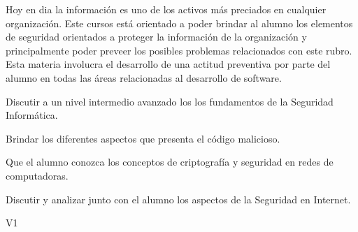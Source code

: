 \begin{syllabus}


\begin{justification}
Hoy en dia la información es uno de los activos más preciados en cualquier organización.
Este cursos está orientado a poder brindar al alumno los elementos de seguridad orientados a proteger la
información de la organización y principalmente poder preveer los posibles problemas relacionados con este rubro.
Esta materia involucra el desarrollo de una actitud preventiva por parte del alumno en todas las áreas
relacionadas al desarrollo de software.
\end{justification}

\begin{goals}
\item Discutir a un nivel intermedio avanzado los los fundamentos de la Seguridad Informática.
\item Brindar los diferentes aspectos que presenta el código malicioso.
\item Que el alumno conozca los conceptos de criptografía y seguridad en redes de computadoras.
\item Discutir y analizar junto con el alumno los aspectos de la Seguridad en Internet.
\end{goals}

\begin{outcomes}{V1}
    \item {}
    \item {}
    \item {}
    \item {}
    \item {}
    \item {}
    \item {}
    \item {}
\end{outcomes}


\end{syllabus}
